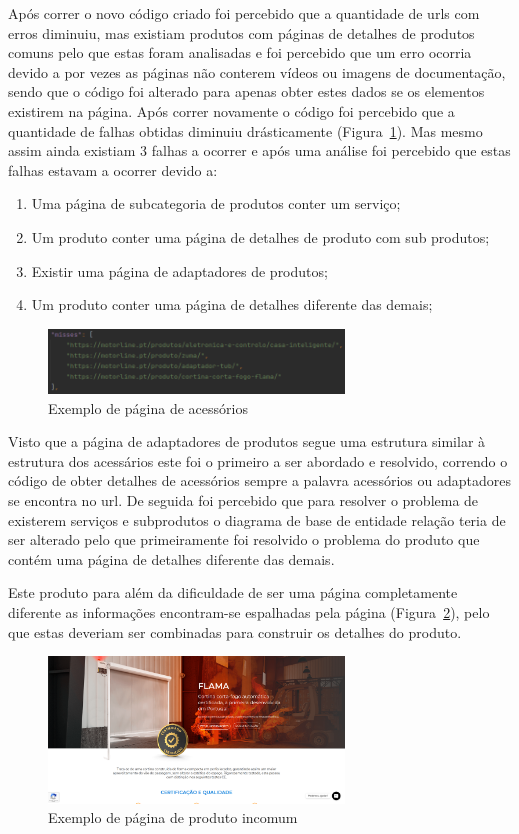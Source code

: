 \newpage

Após correr o novo código criado foi percebido que a quantidade de urls com erros diminuiu, mas existiam produtos com páginas de detalhes de produtos comuns pelo que estas foram analisadas e foi percebido
que um erro ocorria devido a por vezes as páginas não conterem vídeos ou imagens de documentação, sendo que o código foi alterado para apenas obter estes dados se os elementos existirem na página. 
Após correr novamente o código foi percebido que a quantidade de falhas obtidas diminuiu drásticamente (Figura~\ref{fig:59}). Mas mesmo assim ainda existiam 3 falhas a ocorrer e após uma análise foi percebido que
estas falhas estavam a ocorrer devido a:

\begin{enumerate}
    \item Uma página de subcategoria de produtos conter um serviço;
    \item Um produto conter uma página de detalhes de produto com sub produtos;
    \item Existir uma página de adaptadores de produtos;
    \item Um produto conter uma página de detalhes diferente das demais;
\end{enumerate}

\begin{figure}[htb]
    \centering
    
    \includegraphics[width=0.7\textwidth]{images/implementacao/scraper/melhor_corrida.png}
    \caption{Exemplo de página de acessórios}
    \label{fig:59}
\end{figure}

Visto que a página de adaptadores de produtos segue uma estrutura similar à estrutura dos acessários este foi o primeiro a ser abordado e resolvido, correndo o código de obter detalhes de acessórios sempre a 
palavra acessórios ou adaptadores se encontra no url. De seguida foi percebido que para resolver o problema de existerem serviços e subprodutos o diagrama de base de entidade relação teria de ser alterado pelo que
primeiramente foi resolvido o problema do produto que contém uma página de detalhes diferente das demais. 

Este produto para além da dificuldade de ser uma página completamente diferente as informações encontram-se espalhadas pela página (Figura~\ref*{fig:60}), pelo que estas deveriam ser combinadas para construir os detalhes do produto.

\begin{figure}[htb]
    \centering
    
    \includegraphics[width=0.7\textwidth]{images/implementacao/scraper/flama.png}
    \caption{Exemplo de página de produto incomum}
    \label{fig:60}
\end{figure}